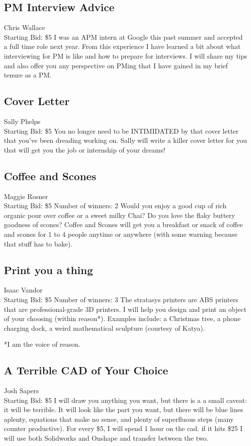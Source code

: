 \documentclass[11pt]{article}
\begin{document}
\subsection{PM Interview Advice}
Chris Wallace
\\
Starting Bid: \$5
\newline
I was an APM intern at Google this past summer and accepted a full time role next year. From this experience I have learned a bit about what interviewing for PM is like and how to prepare for interviews. I will share my tips and also offer you any perspective on PMing that I have gained in my brief tenure as a PM.
\subsection{Cover Letter}
Sally Phelps
\\
Starting Bid: \$5
\newline
You no longer need to be INTIMIDATED by that cover letter that you've been dreading working on.  Sally will write a killer cover letter for you that will get you the job or internship of your dreams!
\subsection{Coffee and Scones}
Maggie Rosner
\\
Starting Bid: \$5
\newline
Number of winners: 2
\newline
Would you enjoy a good cup of rich organic pour over coffee or a sweet milky Chai? Do you love the flaky buttery goodness of scones? 
Coffee and Scones will get you a breakfast or snack of coffee and scones for 1 to 4 people anytime or anywhere (with some warning because that stuff has to bake).
\subsection{Print you a thing}
Isaac Vandor
\\
Starting Bid: \$5
\newline
Number of winners: 3
\newline
The stratasys printers are ABS printers that are professional-grade 3D printers. I will help you design and print an object of your choosing (within reason*). Examples include: a Christmas tree, a phone charging dock, a weird mathematical sculpture (courtesy of Katya). 

*I am the voice of reason.
\subsection{A Terrible CAD of Your Choice}
Josh Sapers
\\
Starting Bid: \$5
\newline
I will draw you anything you want, but there is a a small caveat: it will be terrible. It will look like the part you want, but there will be blue lines aplenty, equations that make no sense, and plenty of superfluous steps (many counter productive). For every \$5, I will spend 1 hour on the cad. if it hits \$25 I will use both Solidworks and Onshape and transfer between the two.
\end{document}
